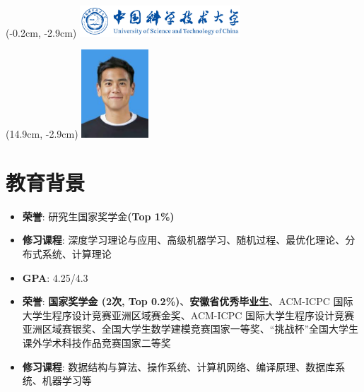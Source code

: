 \documentclass{cls/resume}
\begin{document}


\begin{textblock*}{6cm}(-0.2cm, -2.9cm)
    \includegraphics[width=6cm]{image/logo.png}
\end{textblock*}
\begin{textblock*}{2.5cm}(14.9cm, -2.9cm)
    \includegraphics[width=2.5cm]{image/identification_photo.jpeg}
\end{textblock*}

\vspace{0.2cm} 

\section{教育背景}
\begin{itemize}[parsep=0.2ex]
    \item \textbf{荣誉}: 研究生国家奖学金\textbf{(Top 1\%)}
    \item \textbf{修习课程}: 深度学习理论与应用、高级机器学习、随机过程、最优化理论、分布式系统、计算理论
\end{itemize}
\begin{itemize}[parsep=0.2ex]
    \item \textbf{GPA}: 4.25/4.3
    \item \textbf{荣誉}: \textbf{国家奖学金 (2次, Top 0.2\%)}、\textbf{安徽省优秀毕业生}、ACM-ICPC 国际大学生程序设计竞赛亚洲区域赛金奖、ACM-ICPC 国际大学生程序设计竞赛亚洲区域赛银奖、全国大学生数学建模竞赛国家一等奖、“挑战杯”全国大学生课外学术科技作品竞赛国家二等奖
    \item \textbf{修习课程}: 数据结构与算法、操作系统、计算机网络、编译原理、数据库系统、机器学习等
\end{itemize}
\end{document}
